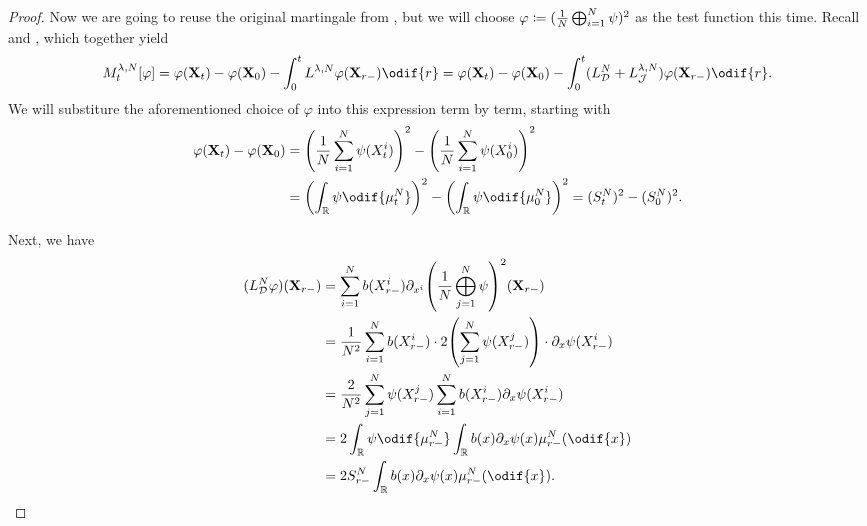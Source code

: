 \begin{proof}
  Now we are going to reuse the original martingale from , but we will choose \(\varphi \coloneqq \lparen \frac{1}{N} \bigoplus_{i=1}^N \psi \rparen^2\) as the test function this time.
  Recall  and , which together yield
  \begin{equation}
    M_t^{\lambda, N}[\varphi]
    = \varphi(\bm{X}_t) - \varphi(\bm{X}_0) - \int_0^t L^{\lambda, N} \varphi (\bm{X}_{r-}) \odif{r}
    = \varphi(\bm{X}_t) - \varphi(\bm{X}_0) - \int_0^t (L_{\cD}^{N} + L_{\cJ}^{\lambda, N}) \varphi (\bm{X}_{r-}) \odif{r}.
  \end{equation}
  We will substiture the aforementioned choice of \( \varphi \) into this expression term by term, starting with
  \begin{equation}
    \begin{split}
      \varphi(\bm{X}_t) - \varphi(\bm{X}_0)
       & = \br*{\frac{1}{N} \sum_{i=1}^N \psi(X_t^i)}^2 - \br*{\frac{1}{N} \sum_{i=1}^N \psi(X_0^i)}^2 \\
       & = \br*{ \int_\potspace \psi \odif{\mu_t^N} }^2 - \br*{ \int_\potspace \psi \odif{\mu_0^N} }^2
      = (S_t^N)^2 - (S_0^N)^2.
    \end{split}
  \end{equation}

  Next, we have
  \begin{equation}
    \begin{split}
      (L_{\cD}^{N} \varphi) (\bm{X}_{r-})
       & = \sum_{i=1}^N b(X_{r-}^i) \partial_{x^i}\br*{ \frac{1}{N} \bigoplus_{j=1}^N \psi }^2 (\bm{X}_{r-})               \\
       & = \frac{1}{N^2} \sum_{i=1}^N b(X_{r-}^i) \cdot 2 \br*{ \sum_{j=1}^N \psi(X_{r-}^j) } \cdot \partial_x \psi(X_{r-}^i) \\
       & = \frac{2}{N^2} \sum_{j=1}^N \psi(X_{r-}^j) \sum_{i=1}^N b(X_{r-}^i) \partial_x \psi(X_{r-}^i)                       \\
       & = 2 \int_\potspace \psi \odif{\mu_{r-}^N} \int_\potspace b(x) \partial_x \psi (x) \mu_{r-}^N(\odif{x})            \\
       & = 2 S_{r-}^N \int_\potspace b(x) \partial_x \psi (x) \mu_{r-}^N(\odif{x}).
    \end{split}
  \end{equation}


\end{proof}
